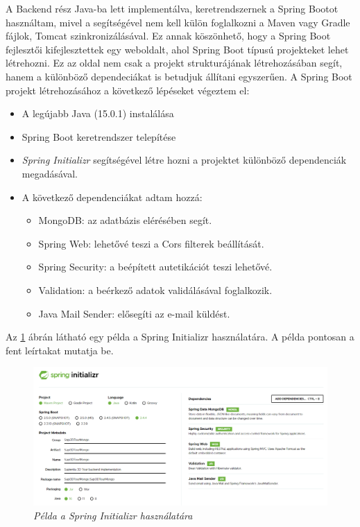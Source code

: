 A Backend rész Java-ba lett implementálva, keretrendszernek a Spring Bootot használtam, mivel a segítségével nem kell külön foglalkozni a Maven vagy Gradle fájlok, Tomcat szinkronizálásával. Ez annak köszönhető, hogy a Spring Boot fejlesztői kifejlesztettek egy weboldalt, ahol Spring Boot típusú projekteket lehet létrehozni. Ez az oldal nem csak a projekt strukturájának létrehozásában segít, hanem a különböző dependeciákat is betudjuk állítani egyszerűen. A Spring Boot projekt létrehozásához a következő lépéseket végeztem el:
\begin{itemize}
	\item A legújabb Java (15.0.1) instalálása
	\item Spring Boot keretrendszer telepítése 
	\item{\textit{ Spring Initializr}\footnotemark} segítségével létre hozni a projektet különböző dependenciák megadásával.
	\item A következő dependenciákat adtam hozzá:
		 \begin{itemize}
		 	\item MongoDB: az adatbázis elérésében segít.
		 	\item Spring Web: lehetővé teszi a Cors filterek beállítását.
		 	\item Spring Security: a beépített autetikációt teszi lehetővé.
		 	\item Validation: a beérkező adatok validálásával foglalkozik.
		 	\item Java Mail Sender: elősegíti az e-mail küldést.
		 \end{itemize}
\end{itemize}

Az \ref{fig:springInit} ábrán látható egy példa a Spring Initializr használatára. A példa pontosan a fent leírtakat mutatja be. 
\begin{figure}[H]
	\centering
	\includegraphics[width=0.8\linewidth]{figures/images/springInit.png}
	\caption[Példa a Spring Initializr használatára]{\textit{Példa a Spring Initializr használatára}}
	\label{fig:springInit}
\end{figure}

